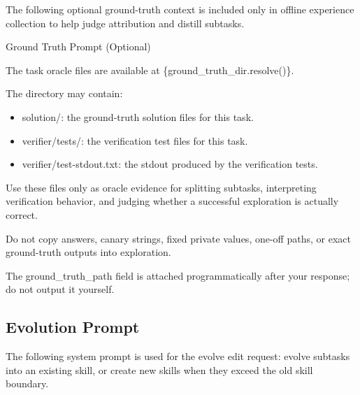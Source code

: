 \documentclass{llmxive}
\providecommand{\svinlinecode}[1]{{\ttfamily #1}}
\begin{document}
\noindent The following optional ground-truth context is included only in offline experience collection to help judge attribution and distill subtasks.\par

\begin{svpromptbox}{Ground Truth Prompt (Optional)}

The task oracle files are available at \svinlinecode{\{ground\_truth\_dir.resolve()\}}.\par
The directory may contain:\par
\smallskip
\begin{itemize}
\item \svinlinecode{solution/}: the ground-truth solution files for this task.
\item \svinlinecode{verifier/tests/}: the verification test files for this task.
\item \svinlinecode{verifier/test-stdout.txt}: the stdout produced by the verification tests.
\end{itemize}
\smallskip
Use these files only as oracle evidence for splitting subtasks, interpreting verification behavior, and judging whether a successful exploration is actually correct.\par
Do not copy answers, canary strings, fixed private values, one-off paths, or exact ground-truth outputs into \svinlinecode{exploration}.\par
The \svinlinecode{ground\_truth\_path} field is attached programmatically after your response; do not output it yourself.\par

\end{svpromptbox}

\subsection{Evolution Prompt}
\label{app:evolution-prompt}


\noindent The following system prompt is used for the evolve edit request: evolve subtasks into an existing skill, or create new skills when they exceed the old skill boundary.\par
\end{document}
